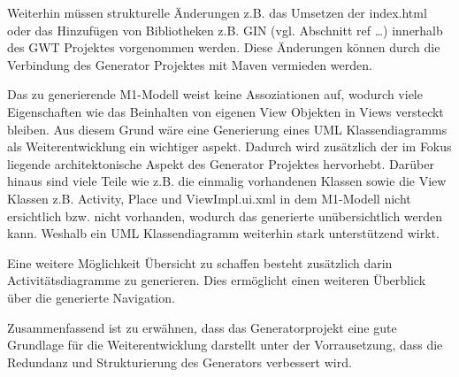 Weiterhin müssen strukturelle Änderungen z.B. das Umsetzen der
index.html oder das Hinzufügen von Bibliotheken z.B. GIN (vgl. Abschnitt ref
\ldots) innerhalb des GWT Projektes vorgenommen werden. Diese Änderungen können
durch die Verbindung des Generator Projektes mit Maven vermieden werden.

Das zu generierende M1-Modell weist keine Assoziationen auf, wodurch viele
Eigenschaften wie das Beinhalten von eigenen View Objekten in Views versteckt
bleiben. Aus diesem Grund wäre eine Generierung eines UML Klassendiagramms als
Weiterentwicklung ein wichtiger aspekt. Dadurch wird zusätzlich der im Fokus
liegende architektonische Aspekt des Generator Projektes hervorhebt. Darüber
hinaus sind viele Teile wie z.B. die einmalig vorhandenen Klassen sowie die View
Klassen z.B. Activity, Place und ViewImpl.ui.xml in dem M1-Modell nicht
ersichtlich bzw. nicht vorhanden, wodurch das generierte unübersichtlich werden
kann. Weshalb ein UML Klassendiagramm weiterhin stark unterstützend wirkt. 

Eine weitere Möglichkeit Übersicht zu schaffen besteht zusätzlich darin
Activitätsdiagramme zu generieren. Dies ermöglicht einen weiteren Überblick über
die generierte Navigation.

Zusammenfassend ist zu erwähnen, dass das Generatorprojekt eine gute
Grundlage für die Weiterentwicklung darstellt unter der Vorrausetzung, dass die
Redundanz und Strukturierung des Generators verbessert wird.